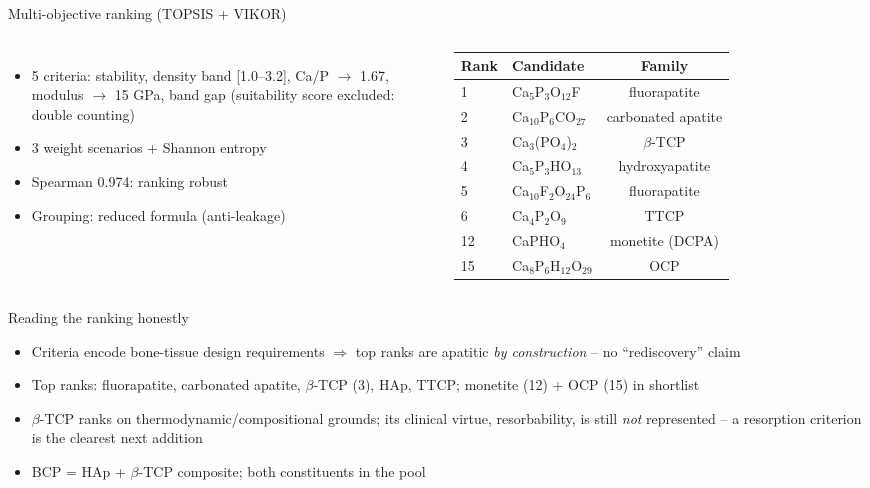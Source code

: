 \documentclass[10pt,aspectratio=169]{beamer}
\begin{document}
\begin{frame}{Multi-objective ranking (TOPSIS + VIKOR)}
\begin{columns}
\begin{itemize}\small
\item 5 criteria: stability, density band [1.0--3.2], Ca/P $\to$ 1.67, modulus $\to$ 15 GPa, band gap (suitability score excluded: double counting)
\item 3 weight scenarios + Shannon entropy
\item Spearman 0.974: ranking robust
\item Grouping: reduced formula (anti-leakage)
\end{itemize}
\begin{table}
\centering
\begin{tabular}{llc}
\toprule
Rank & Candidate & Family \\
\midrule
1 & Ca$_5$P$_3$O$_{12}$F & fluorapatite \\
2 & Ca$_{10}$P$_6$CO$_{27}$ & carbonated apatite \\
3 & Ca$_3$(PO$_4$)$_2$ & $\beta$-TCP \\
4 & Ca$_5$P$_3$HO$_{13}$ & hydroxyapatite \\
5 & Ca$_{10}$F$_2$O$_{24}$P$_6$ & fluorapatite \\
6 & Ca$_4$P$_2$O$_9$ & TTCP \\
12 & CaPHO$_4$ & monetite (DCPA) \\
15 & Ca$_8$P$_6$H$_{12}$O$_{29}$ & OCP \\
\bottomrule
\end{tabular}
\end{table}
\end{columns}
\end{frame}

\begin{frame}{Reading the ranking honestly}
\begin{itemize}
\item Criteria encode bone-tissue design requirements $\Rightarrow$ top ranks are apatitic \emph{by construction} -- no ``rediscovery'' claim
\item Top ranks: fluorapatite, carbonated apatite, $\beta$-TCP (3), HAp, TTCP; monetite (12) + OCP (15) in shortlist
\item $\beta$-TCP ranks on thermodynamic/compositional grounds; its clinical virtue, resorbability, is still \emph{not} represented -- a resorption criterion is the clearest next addition
\item BCP = HAp + $\beta$-TCP composite; both constituents in the pool
\end{itemize}
\end{frame}
\end{document}
